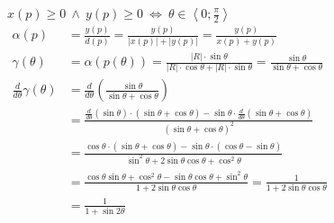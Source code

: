 \item $x\left(p\right) \geqslant 0 \ \wedge \  y\left(p\right) \geqslant 0 \ \Leftrightarrow \ \theta \in \left\langle 0;\frac{\pi}{2}\right\rangle$\\
  		\begin{align*}
        	\alpha\left( p\right) & = \frac{
        		y\left(p\right)
        	}{
        		d\left(p\right)
        	} = \frac{
        		y\left(p\right)
        	}{
        		\left|x\left(p\right)\right| + \left|y\left(p\right)\right|
        	} = \frac{
        		y\left(p\right)
        	}{
        		x\left(p\right) + y\left(p\right)
        	} & \hspace{10cm}\\
        	\gamma\left( \theta\right) & = \alpha\left( p\left(\theta\right) \right) = \frac{
        		\left|R\right| \cdot \sin \theta
        	}{
        		\left|R\right| \cdot \cos \theta + \left|R\right| \cdot \sin \theta
        	} =\frac{
        		\sin \theta
        	}{
        		\sin \theta + \cos \theta
        	} \\
        	\frac{
        		d
        	}{
        		d\theta
        	}\gamma\left( \theta\right) & = \frac{
        		d
        	}{
        		d\theta
        	}\left(
        		\frac{ 
        			\sin \theta
        		}{
        			\sin \theta + \cos \theta
        		}
        	\right) \\ 
        	& =\frac{
        		\frac{
        			d
        		}{
        			d\theta
        		}\left(
        			\sin\theta
        		\right)\cdot\left(
        			\sin \theta + \cos \theta
        		\right)
        		-\sin\theta\cdot\frac{
        			d
        		}{
        			d\theta
        		}\left(\sin \theta + \cos \theta\right)
        	}{
        		\left(
        			\sin \theta + \cos \theta
        		\right)^2
        	}\\
        	& =\frac{
        		\cos\theta\cdot\left(\sin \theta + \cos \theta\right)
        		-\sin\theta\cdot\left(\cos \theta - \sin \theta\right)
        	}{
        		\sin^2 \theta + 2\sin\theta\cos\theta + \cos^2 \theta 
        	}\\
        	& =\frac{
        		\cos\theta\sin \theta + \cos^2 \theta
        		-\sin\theta\cos \theta  + \sin^2 \theta
        	}{
        		1 + 2\sin\theta\cos\theta
        	} = \frac{
        		1
        	}{
        		1 + 2\sin\theta\cos\theta
        	} \\
        	& = \frac{
        		1
        	}{
        		1 + \sin 2\theta
        	} 
        \end{align*}
